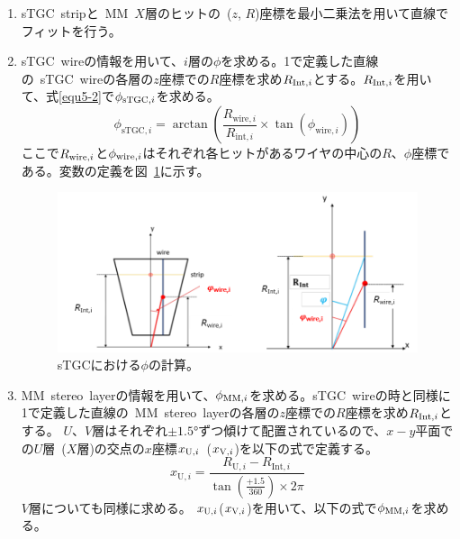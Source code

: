 \begin{enumerate}
    \item sTGC~stripと~MM~$X$層のヒットの~($z$, $R$)座標を最小二乗法を用いて直線でフィットを行う。
    \item sTGC~wireの情報を用いて、$i$層の$\phi$を求める。1で定義した直線の~sTGC~wireの各層の$z$座標での$R$座標を求め$R_{{\rm{Int}},i}$とする。$R_{{\rm{Int}},i}$を用いて、式\eqref{equ5-2}で$\phi_{{\rm{sTGC}},i}$を求める。
    \begin{equation}
        \phi_{\mathrm{sTGC},i}=\arctan\left(\frac{R_{\mathrm{wire},i}}{R_{\mathrm{int},i}} \times \tan(\phi_{\mathrm{wire},i})\right)\label{equ5-2}
    \end{equation}
    ここで$R_{{\rm{wire}},i}$と$\phi_{{\rm{wire}},i}$はそれぞれ各ヒットがあるワイヤの中心の$R$、$\phi$座標である。変数の定義を図~\ref{fig:5-2}に示す。
    
    \begin{figure}[H]
        \centering
        \includegraphics[clip, width=12cm]{fig/5/sTGC_phi.png}
        \caption{sTGCにおける$\phi$の計算\cite{article:noguchi}。}
        \label{fig:5-2}
    \end{figure}
        
    \item MM~stereo~layerの情報を用いて、$\phi_{{\rm{MM}},i}$を求める。sTGC~wireの時と同様に1で定義した直線の~MM~stereo~layerの各層の$z$座標での$R$座標を求め$R_{{\rm{Int}},i}$とする。
    $U$、$V$層はそれぞれ$\pm\si{\ang{1.5}}$ずつ傾けて配置されているので、$x-y$平面での$U$層~($X$層)の交点の$x$座標$x_{{\rm{U}},i}$~($x_{{\rm{V}},i}$)を以下の式で定義する。
    \begin{equation}
        x_{\mathrm{U},i}=\frac{R_{\mathrm{U},i}-R_{\mathrm{Int},i}}{\tan(\frac{+1.5}{360}) \times 2\pi}\label{equ5-3}
    \end{equation}
    $V$層についても同様に求める。
    $x_{{\rm{U}},i}$($x_{{\rm{V}},i}$)を用いて、以下の式で$\phi_{{\rm{MM}},i}$を求める。
    

\end{enumerate}
